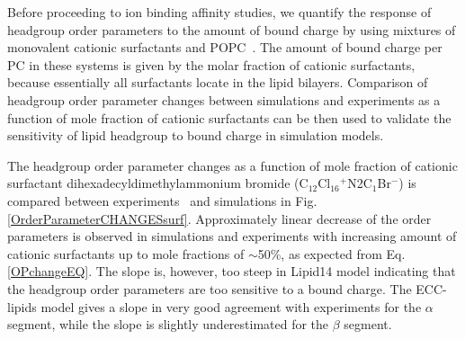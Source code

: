 \documentclass[aip,jcp,twocolumn]{revtex4}
\begin{document}
Before proceeding to ion binding affinity studies, we quantify
the response of headgroup order parameters to the amount of 
bound charge by using mixtures of monovalent cationic surfactants
and POPC~\cite{scherer89}. The amount of bound charge per PC 
in these systems is 
given by the molar fraction of cationic surfactants, because essentially all surfactants 
locate in the lipid bilayers. Comparison of headgroup order parameter
changes between simulations and experiments 
as a function of mole fraction of cationic surfactants 
can be then used to validate the sensitivity of
lipid headgroup to bound charge in simulation models.

%

The headgroup order parameter changes as a function of mole fraction
of cationic surfactant dihexadecyldimethylammonium bromide (C$_{12}$Cl$_{16}$$^+$N2C$_1$Br$^-$) 
is compared between experiments~\cite{scherer89} and simulations in
Fig. \ref{OrderParameterCHANGESsurf}. 
Approximately linear decrease of the order parameters is observed
in simulations and experiments with increasing amount of cationic
surfactants up to mole fractions of $\sim$50\%,
as expected from Eq. \ref{OPchangeEQ}.
The slope is, however, too steep in Lipid14 model indicating that 
the headgroup order parameters are too sensitive to a bound charge.
The ECC-lipids model gives a slope in very good agreement with experiments
for the $\alpha$ segment, while the slope is slightly
underestimated for the $\beta$ segment.
\end{document}

